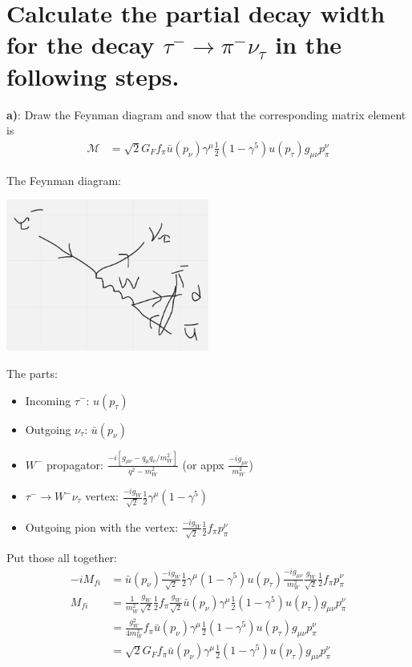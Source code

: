 \section{Calculate the partial decay width for the decay \texorpdfstring{$\tau^- \to \pi^- \nu_\tau$}{tau- to pi- nu-tau} in the following steps.}

\textbf{a)}: Draw the Feynman diagram and snow that the corresponding matrix element is
\begin{align*}
    \mathcal{M} &= \sqrt{2}G_F f_\pi \bar{u}(p_\nu) \gamma^\mu \frac{1}{2}(1 - \gamma^5) u(p_\tau) g_{\mu\nu}p_\pi^\nu
\end{align*}

The Feynman diagram:
\begin{center}
    \includegraphics[width=0.5\textwidth]{q2a_diagram.png}
\end{center}

The parts:
\begin{itemize}
    \item Incoming $\tau^-$: $u(p_\tau)$
    \item Outgoing $\nu_\tau$: $\bar{u}(p_\nu)$
    \item $W^-$ propagator: $\frac{-i[g_{\mu\nu} - q_\mu q_\nu / m_W^2]}{q^2-m_W^2}$ (or appx $\frac{-ig_{\mu\nu}}{m_W^2}$)
    \item $\tau^- \to W^- \nu_\tau$ vertex: $\frac{-ig_W}{\sqrt{2}}\frac{1}{2}\gamma^\mu(1-\gamma^5)$
    \item Outgoing pion with the vertex: $\frac{-ig_W}{\sqrt{2}}\frac{1}{2}f_\pi p_\pi^\nu$
\end{itemize}

Put those all together:
\begin{align*}
    -iM_{fi} &= \bar{u}(p_\nu) \frac{-ig_W}{\sqrt{2}}\frac{1}{2}\gamma^\mu(1-\gamma^5) u(p_\tau) \frac{-ig_{\mu\nu}}{m_W^2}\frac{g_W}{\sqrt{2}}\frac{1}{2}f_\pi p_\pi^\nu \\
    M_{fi} &= \frac{1}{m_W^2}\frac{g_W}{\sqrt{2}}\frac{1}{2}f_\pi \frac{g_W}{\sqrt{2}}\bar{u}(p_\nu)\gamma^\mu\frac{1}{2}(1-\gamma^5) u(p_\tau) g_{\mu\nu} p_\pi^\nu \\
    &= \frac{g_W^2}{4m_W^2}f_\pi \bar{u}(p_\nu)\gamma^\mu\frac{1}{2}(1-\gamma^5) u(p_\tau) g_{\mu\nu} p_\pi^\nu \\
    &= \sqrt{2} G_F f_\pi \bar{u}(p_\nu)\gamma^\mu\frac{1}{2}(1-\gamma^5) u(p_\tau) g_{\mu\nu} p_\pi^\nu \\
\end{align*}

